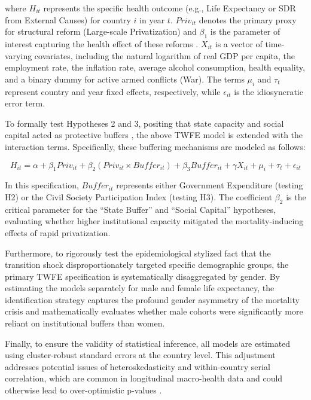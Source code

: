 \documentclass[12pt]{article}
\begin{document}
where $H_{it}$ represents the specific health outcome (e.g., Life Expectancy or SDR from External Causes) for country $i$ in year $t$. $Priv_{it}$ denotes the primary proxy for structural reform 
(Large-scale Privatization) and $\beta_{1}$ is the parameter of interest capturing the health effect of these reforms \citep{Stuckler2009, Brainerd2001}. $X_{it}$ is a vector of time-varying covariates, 
including the natural logarithm of real GDP per capita, the employment rate, the inflation rate, average alcohol consumption, health equality, and a binary dummy for active armed conflicts (War).
 The terms $\mu_{i}$ and $\tau_{t}$ represent country and year fixed effects, respectively, while $\epsilon_{it}$ is the idiosyncratic error term.

To formally test Hypotheses 2 and 3, positing that state capacity and social capital acted as protective buffers \citep{Hamm2012, Scheiring2018}, the above TWFE model is extended with the interaction 
terms. Specifically, these buffering mechanisms are modeled as follows:

\begin{equation}
H_{it}=\alpha+\beta_{1}Priv_{it}+\beta_{2}(Priv_{it}\times Buffer_{it})+\beta_{3}Buffer_{it}+\gamma X_{it}+\mu_{i}+\tau_{t}+\epsilon_{it}
\end{equation}

In this specification, $Buffer_{it}$ represents either Government Expenditure (testing H2) or the Civil Society Participation Index (testing H3). The coefficient $\beta_2$ is the critical parameter for 
the ``State Buffer'' and ``Social Capital'' hypotheses, evaluating whether higher institutional capacity mitigated the mortality-inducing effects of rapid privatization. 

Furthermore, to rigorously test the epidemiological stylized fact that the transition shock disproportionately targeted specific demographic groups, the primary TWFE specification is systematically 
disaggregated by gender. By estimating the models separately for male and female life expectancy, the identification strategy captures the profound gender asymmetry of the mortality crisis and mathematically 
evaluates whether male cohorts were significantly more reliant on institutional buffers than women.


Finally, to ensure the validity of statistical inference, all models are estimated using cluster-robust standard errors at the country level. This adjustment addresses potential issues of heteroskedasticity 
and within-country serial correlation, which are common in longitudinal macro-health data and could otherwise lead to over-optimistic p-values \citep{Gerry2012, CameronMiller2015, Bertrand2004}.
\end{document}
